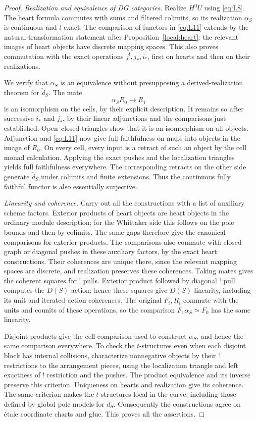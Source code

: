 \documentclass[11pt]{article}
\numberwithin{equation}{section}
\theoremstyle{definition}
\theoremstyle{remark}
\begin{document}
\begin{proof}
\smallskip
\noindent\emph{Realization and equivalence of DG categories.}
Realize $H^0U$ using \eqref{eq:L8}.  The heart formula commutes
with sums and filtered colimits, so its realization $\alpha_S$
is continuous and $t$-exact.  The comparison of functors in
\eqref{eq:L11} extends by the natural-transformation statement
after Proposition~\ref{local:heart}: the relevant images of
heart objects have discrete mapping spaces.  This also proves
commutation with the exact operations $j^!,j_*,i_*$, first on
hearts and then on their realizations.

We verify that $\alpha_S$ is an equivalence without presupposing
a derived-realization theorem for $\check d_S$.  The mate
\[
                            \alpha_SR_0\longrightarrow R_1
\]
is an isomorphism on the cells, by their explicit description.
It remains so after successive $i_*$ and $j_*$, by their linear
adjunctions and the comparisons just established.  Open--closed
triangles show that it is an isomorphism on all objects.
Adjunction and \eqref{eq:L11} now give full faithfulness on maps
into objects in the image of $R_0$.  On every cell, every input
is a retract of such an object by the cell monad calculation.
Applying the exact pushes and the localization triangles yields
full faithfulness everywhere.  The corresponding retracts on
the other side generate $\check d_S$ under colimits and finite
extensions.  Thus the continuous fully faithful functor is also
essentially surjective.

\smallskip
\noindent\emph{Linearity and coherence.}
Carry out all the
constructions with a list of auxiliary scheme factors.  Exterior
products of heart objects are heart objects in the ordinary
module description; for the Whittaker side this follows on the
pole bounds and then by colimits.  The same gaps therefore give
the canonical comparisons for exterior products.  The comparisons
also commute with closed graph or diagonal pushes in these
auxiliary factors, by the exact heart constructions.  Their
coherences are unique there, since the relevant mapping spaces
are discrete, and realization preserves these coherences.
Taking mates gives the coherent squares for ! pulls.  Exterior
product followed by diagonal ! pull computes the $D(S)$ action;
hence these squares give $D(S)$-linearity, including its unit
and iterated-action coherences.  The original $F_i,R_i$ commute
with the units and counits of these operations, so the comparison
$F_1\alpha_S\simeq F_0$ has the same linearity.

Disjoint products give the cell comparison used to construct
$\alpha_S$, and hence the same comparison everywhere.  To check
the $t$-structures even when each disjoint block has internal
collisions, characterize nonnegative objects by their !
restrictions to the arrangement pieces, using the localization
triangle and left exactness of ! restriction and the pushes.
The product equivalence and its inverse preserve this criterion.
Uniqueness on hearts and realization give its coherence.
The same criterion makes the $t$-structures local in the curve,
including those defined by global pole models for $d_S$.
Consequently the constructions agree on étale coordinate charts
and glue.  This proves all the assertions.
\end{proof}
\end{document}
